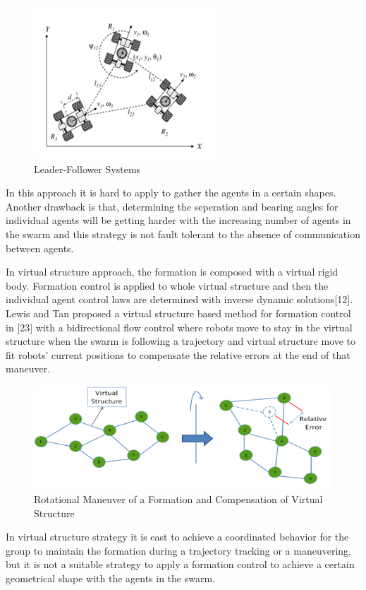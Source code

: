 \documentclass[twoside]{article}
\begin{document}
\begin{figure}[H]
	\caption{Leader-Follower Systems}
	\centering
	\includegraphics[scale = 1]{leader}
\end{figure}


In this approach it is hard to apply to gather the agents in a certain shapes. Another drawback is that, determining the seperation and bearing angles for individual agents will be getting harder with the increasing number of agents in the swarm and this strategy is not fault tolerant to the absence of communication between agents.


In virtual structure approach, the formation is composed with a virtual rigid body. Formation control is applied to whole virtual structure and then the individual agent control laws are determined with inverse dynamic solutions[12].  Lewis and Tan proposed a virtual structure based method for formation control in [23] with a bidirectional flow control where robots move to stay in the virtual structure when the swarm is following a trajectory and virtual structure move to fit robots' current positions to compensate the relative errors at the end of that maneuver. 

\begin{figure}[H]
	\caption{Rotational Maneuver of a Formation and Compensation of Virtual Structure}
	\centering
	\includegraphics[scale = 1]{virtual_structure}
\end{figure}

In virtual structure strategy it is east to achieve a coordinated behavior for the group to maintain the formation during a trajectory tracking or a maneuvering, but it is not a suitable strategy to apply a formation control to achieve a certain geometrical shape with the agents in the swarm. 
\end{document}
